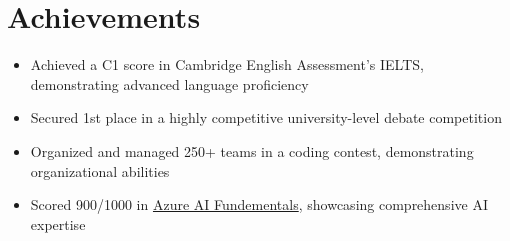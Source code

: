 \documentclass[a4paper,11pt]{article}
\begin{document}
\section{\textbf{{\LARGE Achievements}}}
\begin{itemize}[label={$\bullet$}, leftmargin=*]
\item Achieved a C1 score in Cambridge English Assessment's IELTS, demonstrating advanced language proficiency
\item Secured 1st place in a highly competitive university-level debate competition
\item Organized and managed 250+ teams in a coding contest, demonstrating organizational abilities
\item Scored 900/1000 in \textcolor{blue}{\href{https://www.credly.com/badges/e2fb6b1f-1e95-44c2-a0dc-a5b5632e10a5}{Azure AI Fundementals}}, showcasing comprehensive AI expertise
\end{itemize}
\end{document}
